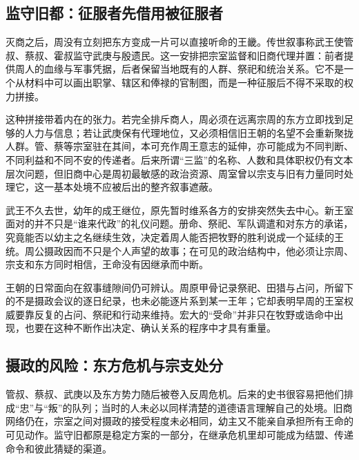 \subsection{监守旧都：征服者先借用被征服者}


灭商之后，周没有立刻把东方变成一片可以直接听命的王畿。传世叙事称武王使管叔、蔡叔、霍叔监守武庚与殷遗民。这一安排把宗室监督和旧商代理并置：前者提供周人的血缘与军事凭据，后者保留当地既有的人群、祭祀和统治关系。它不是一个从材料中可以画出职掌、辖区和俸禄的官制图，而是一种征服后不得不采取的权力拼接。

这种拼接带着内在的张力。若完全排斥商人，周必须在远离宗周的东方立即找到足够的人力与信息；若让武庚保有代理地位，又必须相信旧王朝的名望不会重新聚拢人群。管、蔡等宗室驻在其间，本可充作周王意志的延伸，亦可能成为不同判断、不同利益和不同不安的传递者。后来所谓“三监”的名称、人数和具体职权仍有文本层次问题，但旧商中心是周初最敏感的政治资源、周室曾以宗支与旧有力量同时处理它，这一基本处境不应被后出的整齐叙事遮蔽。


武王不久去世，幼年的成王继位，原先暂时维系各方的安排突然失去中心。新王室面对的并不只是“谁来代政”的礼仪问题。册命、祭祀、军队调遣和对东方的承诺，究竟能否以幼主之名继续生效，决定着周人能否把牧野的胜利说成一个延续的王统。周公摄政因而不只是个人声望的故事；在可见的政治结构中，他必须让宗周、宗支和东方同时相信，王命没有因继承而中断。

王朝的日常面向在叙事缝隙间仍可辨认。周原甲骨记录祭祀、田猎与占问，所留下的不是摄政会议的逐日纪录，也未必能逐片系到某一王年；它却表明早周的王室权威要靠反复的占问、祭祀和行动来维持。宏大的“受命”并非只在牧野或诰命中出现，也要在这种不断作出决定、确认关系的程序中才具有重量。

\subsection{摄政的风险：东方危机与宗支处分}

管叔、蔡叔、武庚以及东方势力随后被卷入反周危机。后来的史书很容易把他们排成“忠”与“叛”的队列；当时的人未必以同样清楚的道德语言理解自己的处境。旧商网络仍在，宗室之间对摄政的接受程度未必相同，幼主又不能亲自承担所有王命的可见动作。监守旧都原是稳定方案的一部分，在继承危机里却可能成为结盟、传递命令和彼此猜疑的渠道。


